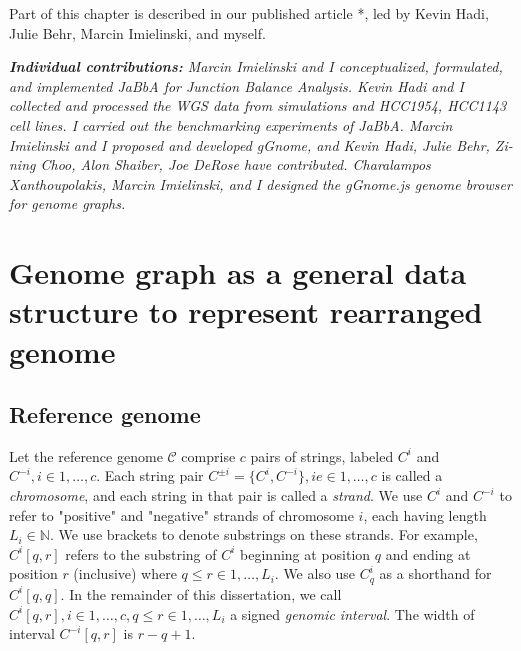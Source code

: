 \documentclass[phd,tocprelim]{cornell}
\begin{document}
Part of this chapter is described in our published article \cite{Hadi2020-um}*, led by Kevin Hadi, Julie Behr, Marcin Imielinski, and myself.

\textit{
    \textbf{Individual contributions:} Marcin Imielinski and I conceptualized, formulated, and implemented JaBbA for Junction Balance Analysis. Kevin Hadi and I collected and processed the WGS data from simulations and HCC1954, HCC1143 cell lines. I carried out the benchmarking experiments of JaBbA. Marcin Imielinski and I proposed and developed gGnome, and Kevin Hadi, Julie Behr, Zi-ning Choo, Alon Shaiber, Joe DeRose have contributed. Charalampos Xanthoupolakis, Marcin Imielinski, and I designed the gGnome.js genome browser for genome graphs.    
}


\newpage

\section{Genome graph as a general data structure to represent rearranged genome}
\subsection{Reference genome}
Let the reference genome $\mathcal{C}$ comprise $c$ pairs of strings, labeled $C^i$ and $C^{-i}, i \in 1,\dots,c$. Each string pair $C^{\pm{i}} = \{C^i, C^{-i}\}, i e\in 1,\dots, c$ is called a \textit{chromosome}, and each string in that pair is called a \textit{strand}. We use $C^i$ and $C^{-i}$ to refer to "positive" and "negative" strands of chromosome $i$, each having length $L_i \in \mathbb{N}$. We use brackets to denote substrings on these strands. For example, $C^{i}[q,r]$ refers to the substring of $C^{i}$ beginning at position $q$ and ending at position $r$ (inclusive) where $q \le r \in 1,\dots,L_i$. We also use $C^{i}_q$ as a shorthand for $C^{i}[q,q]$. In the remainder of this dissertation, we call $C^{i}[q,r], i \in 1, \dots, c, q \le r \in 1, \dots, L_i$ a signed \textit{genomic interval}. The width of interval $C^{-i}[q,r]$ is $r-q+1$.
\end{document}
